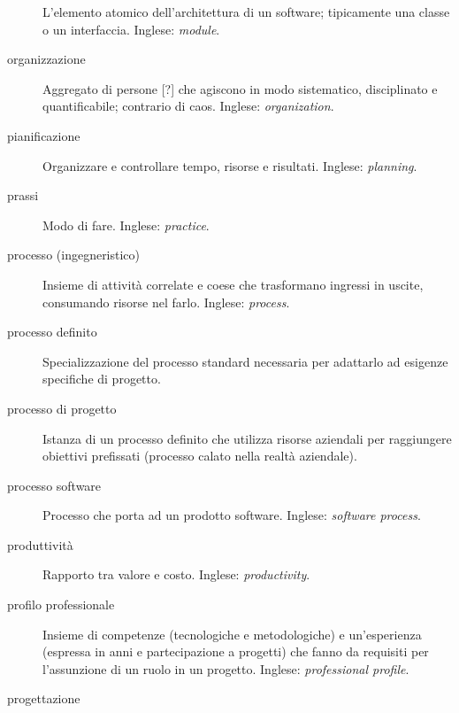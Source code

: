 \documentclass[a4paper]{article}
\begin{document}
\begin{description}
			L'elemento atomico dell'architettura di un software; tipicamente una classe o un interfaccia. Inglese: \emph{module}.
			
	\item[organizzazione] 

			Aggregato di persone [?] che agiscono in modo sistematico, disciplinato e quantificabile; contrario di caos. Inglese: \emph{organization}.
			
	\item[pianificazione] 

			Organizzare e controllare tempo, risorse e risultati. Inglese: \emph{planning}.
			
	\item[prassi] 

			Modo di fare. Inglese: \emph{practice}.
			
	\item[processo (ingegneristico)] 

			Insieme di attività correlate e coese che trasformano ingressi in uscite, consumando risorse nel farlo. Inglese: \emph{process}.
			
	\item[processo definito] 

			Specializzazione del processo standard necessaria per adattarlo ad esigenze specifiche di progetto.
			
	\item[processo di progetto] 

			Istanza di un processo definito che utilizza risorse aziendali per raggiungere obiettivi prefissati (processo calato nella realtà aziendale).
			
	\item[processo software] 

			Processo che porta ad un prodotto software. Inglese: \emph{software process}.
			
	\item[produttività] 

			Rapporto tra valore e costo. Inglese: \emph{productivity}.
			
	\item[profilo professionale] 

			Insieme di competenze (tecnologiche e metodologiche) e un'esperienza (espressa in anni e partecipazione a progetti) che fanno da requisiti per l'assunzione di un ruolo in un progetto. Inglese: \emph{professional profile}.
			
	\item[progettazione] 


\end{description}
\end{document}
